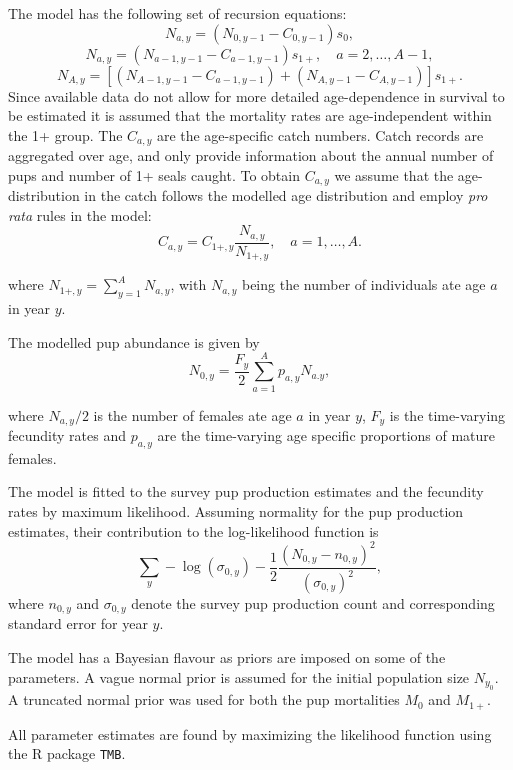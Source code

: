 \documentclass[
]{article}
\begin{document}
The model has the following set of recursion equations: \[
N_{a,y}=\left(N_{0,y-1}-C_{0,y-1}\right)s_0,
\] \[
N_{a,y}=\left(N_{a-1,y-1}-C_{a-1,y-1}\right)s_{1+},\quad a=2,\ldots,A-1,
\] \[
N_{A,y}=\left[\left(N_{A-1,y-1}-C_{a-1,y-1}\right)+\left(N_{A,y-1}-C_{A,y-1}\right)\right]s_{1+}.
\] Since available data do not allow for more detailed age-dependence in
survival to be estimated it is assumed that the mortality rates are
age-independent within the 1+ group. The \(C_{a,y}\) are the
age-specific catch numbers. Catch records are aggregated over age, and
only provide information about the annual number of pups and number of
1+ seals caught. To obtain \(C_{a,y}\) we assume that the
age-distribution in the catch follows the modelled age distribution and
employ \emph{pro rata} rules in the model: \[
C_{a,y} = C_{1+,y}\frac{N_{a,y}}{N_{1+,y}},\quad a = 1,\ldots,A.
\]

where \(N_{1+,y} = \sum_{y=1}^A N_{a,y}\), with \(N_{a,y}\) being the
number of individuals ate age \(a\) in year \(y\).

The modelled pup abundance is given by \[
N_{0,y}=\frac{F_y}{2}\sum_{a=1}^Ap_{a,y}N_{a.y},
\]

where \(N_{a,y}/2\) is the number of females ate age \(a\) in year
\(y\), \(F_y\) is the time-varying fecundity rates and \(p_{a,y}\) are
the time-varying age specific proportions of mature females.

The model is fitted to the survey pup production estimates and the
fecundity rates by maximum likelihood. Assuming normality for the pup
production estimates, their contribution to the log-likelihood function
is \[
\sum_y-\log(\sigma_{0,y})-\frac{1}{2}\frac{\left(N_{0,y}-n_{0,y}\right)^2}{\left(\sigma_{0,y}\right)^2},
\] where \(n_{0,y}\) and \(\sigma_{0,y}\) denote the survey pup
production count and corresponding standard error for year \(y\).

The model has a Bayesian flavour as priors are imposed on some of the
parameters. A vague normal prior is assumed for the initial population
size \(N_{y_0}\). A truncated normal prior was used for both the pup
mortalities \(M_0\) and \(M_{1+}\).

All parameter estimates are found by maximizing the likelihood function
using the R package \texttt{TMB}.
\end{document}
